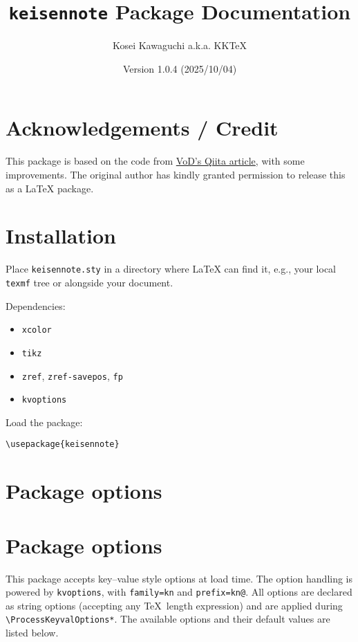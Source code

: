 \documentclass[a4paper,12pt]{article}
\title{\texttt{keisennote} Package Documentation}
\author{Kosei Kawaguchi a.k.a. KKTeX}
\date{Version 1.0.4 (2025/10/04)}
\begin{document}
\begin{titlepage}
  \maketitle
\end{titlepage}
\newpage
\tableofcontents
\newpage

\section{Acknowledgements / Credit}

This package is based on the code from 
\href{https://qiita.com/VoD/items/6849e63b978050218d2f}{VoD's Qiita article}, 
with some improvements. The original author has kindly granted permission 
to release this as a LaTeX package.

\section{Installation}

Place \texttt{keisennote.sty} in a directory where LaTeX can find it, e.g., your local \texttt{texmf} tree or alongside your document.

Dependencies:
\begin{itemize}
    \item \texttt{xcolor} 
    \item \texttt{tikz}
    \item \texttt{zref}, \texttt{zref-savepos}, \texttt{fp}
    \item \texttt{kvoptions}
\end{itemize}


Load the package:

\begin{verbatim}
\usepackage{keisennote}
\end{verbatim}

\section{Package options}
\section{Package options}

This package accepts key--value style options at load time.  
The option handling is powered by \texttt{kvoptions}, with
\texttt{family=kn} and \texttt{prefix=kn@}.  
All options are declared as string options (accepting any \TeX\ length expression)
and are applied during \verb|\ProcessKeyvalOptions*|.  
The available options and their default values are listed below.
\end{document}
